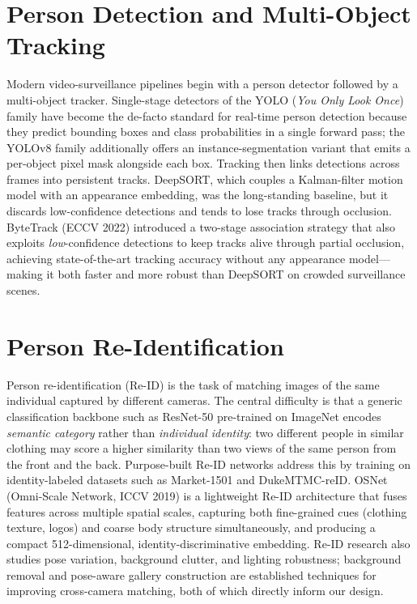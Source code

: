 \documentclass[12pt]{report}
\begin{document}
\section{Person Detection and Multi-Object Tracking}
Modern video-surveillance pipelines begin with a person detector followed by a multi-object tracker. Single-stage detectors of the YOLO (\emph{You Only Look Once}) family have become the de-facto standard for real-time person detection because they predict bounding boxes and class probabilities in a single forward pass; the YOLOv8 family additionally offers an instance-segmentation variant that emits a per-object pixel mask alongside each box. Tracking then links detections across frames into persistent tracks. DeepSORT, which couples a Kalman-filter motion model with an appearance embedding, was the long-standing baseline, but it discards low-confidence detections and tends to lose tracks through occlusion. ByteTrack (ECCV 2022) introduced a two-stage association strategy that also exploits \emph{low}-confidence detections to keep tracks alive through partial occlusion, achieving state-of-the-art tracking accuracy without any appearance model---making it both faster and more robust than DeepSORT on crowded surveillance scenes.

\section{Person Re-Identification}
Person re-identification (Re-ID) is the task of matching images of the same individual captured by different cameras. The central difficulty is that a generic classification backbone such as ResNet-50 pre-trained on ImageNet encodes \emph{semantic category} rather than \emph{individual identity}: two different people in similar clothing may score a higher similarity than two views of the same person from the front and the back. Purpose-built Re-ID networks address this by training on identity-labeled datasets such as Market-1501 and DukeMTMC-reID. OSNet (Omni-Scale Network, ICCV 2019) is a lightweight Re-ID architecture that fuses features across multiple spatial scales, capturing both fine-grained cues (clothing texture, logos) and coarse body structure simultaneously, and producing a compact 512-dimensional, identity-discriminative embedding. Re-ID research also studies pose variation, background clutter, and lighting robustness; background removal and pose-aware gallery construction are established techniques for improving cross-camera matching, both of which directly inform our design.
\end{document}
